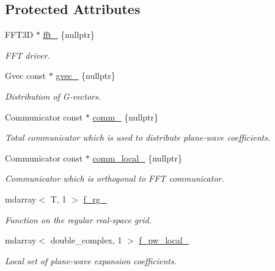 \subsection*{Protected Attributes}
\begin{DoxyCompactItemize}
\item 
F\+F\+T3\+D $\ast$ \hyperlink{classsirius_1_1experimental_1_1_smooth__periodic__function_a9b3daef8e28b49ae6457351ebc8309b7}{fft\+\_\+} \{nullptr\}
\begin{DoxyCompactList}\small\item\em F\+F\+T driver. \end{DoxyCompactList}\item 
Gvec const $\ast$ \hyperlink{classsirius_1_1experimental_1_1_smooth__periodic__function_aaba661779354062cc879601bab773df5}{gvec\+\_\+} \{nullptr\}
\begin{DoxyCompactList}\small\item\em Distribution of G-\/vectors. \end{DoxyCompactList}\item 
Communicator const $\ast$ \hyperlink{classsirius_1_1experimental_1_1_smooth__periodic__function_a5925101182e8599a99871c991b9cc1ba}{comm\+\_\+} \{nullptr\}
\begin{DoxyCompactList}\small\item\em Total communicator which is used to distribute plane-\/wave coefficients. \end{DoxyCompactList}\item 
Communicator const $\ast$ \hyperlink{classsirius_1_1experimental_1_1_smooth__periodic__function_a656ece802c6021543350b9b6b523b57b}{comm\+\_\+local\+\_\+} \{nullptr\}
\begin{DoxyCompactList}\small\item\em Communicator which is orthogonal to F\+F\+T communicator. \end{DoxyCompactList}\item 
mdarray$<$ T, 1 $>$ \hyperlink{classsirius_1_1experimental_1_1_smooth__periodic__function_a67ff538738e5081c70be905593d66f7f}{f\+\_\+rg\+\_\+}
\begin{DoxyCompactList}\small\item\em Function on the regular real-\/space grid. \end{DoxyCompactList}\item 
mdarray$<$ double\+\_\+complex, 1 $>$ \hyperlink{classsirius_1_1experimental_1_1_smooth__periodic__function_a928aab8f7cec0e58d30ffdfd825d2340}{f\+\_\+pw\+\_\+local\+\_\+}
\begin{DoxyCompactList}\small\item\em Local set of plane-\/wave expansion coefficients. \end{DoxyCompactList}\item 

\end{DoxyCompactItemize}
